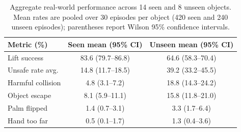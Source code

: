 \begin{table}[H]
\centering
\normalsize
\caption{Aggregate real-world performance across 14 seen and 8 unseen objects.
Mean rates are pooled over 30 episodes per object (420 seen and 240 unseen
episodes); parentheses report Wilson 95\% confidence intervals.}
\label{tab:seen_unseen_summary}
\setlength{\tabcolsep}{12pt}
\renewcommand{\arraystretch}{1.14}
\begin{tabular}{lcc}
\toprule
Metric (\%) & Seen mean (95\% CI) & Unseen mean (95\% CI) \\
\midrule
Lift success
  & 83.6 (79.7--86.8) & 64.6 (58.3--70.4) \\
Unsafe rate avg.
  & 14.8 (11.7--18.5) & 39.2 (33.2--45.5) \\
Harmful collision
  & 4.8 (3.1--7.2) & 18.8 (14.3--24.2) \\
Object escape
  & 8.1 (5.9--11.1) & 15.8 (11.8--21.0) \\
Palm flipped
  & 1.4 (0.7--3.1) & 3.3 (1.7--6.4) \\
Hand too far
  & 0.5 (0.1--1.7) & 1.3 (0.4--3.6) \\
\bottomrule
\end{tabular}
\end{table}
